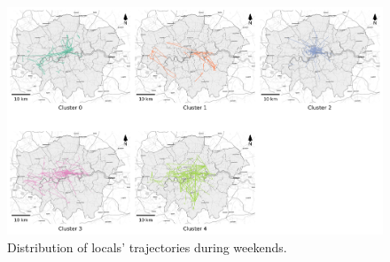 \documentclass{article}
\theoremstyle{definition}
\theoremstyle{remark}
\begin{document}
\begin{figure}[!h]
\centering
\includegraphics[width=1\textwidth]{figures/traj_distribution_weekend_locals.png}
\caption{\label{fig:traj_distribution_weekend_locals}Distribution of locals' trajectories during weekends.}
\end{figure}
\end{document}
